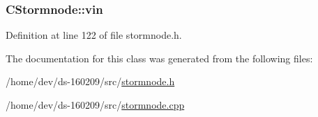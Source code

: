 \hypertarget{class_c_stormnode_a62f5b0f436ca313afd612b07d687127f}{}
\subsubsection[{vin}]{ C\+Stormnode\+::vin}\label{class_c_stormnode_a62f5b0f436ca313afd612b07d687127f}


Definition at line 122 of file stormnode.\+h.



The documentation for this class was generated from the following files\+:\begin{DoxyCompactItemize}
\item 
/home/dev/ds-\/160209/src/\hyperlink{stormnode_8h}{stormnode.\+h}\item 
/home/dev/ds-\/160209/src/\hyperlink{stormnode_8cpp}{stormnode.\+cpp}\end{DoxyCompactItemize}
